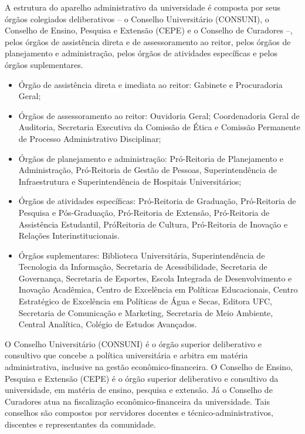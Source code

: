 A estrutura do aparelho administrativo da universidade é composta por seus órgãos colegiados deliberativos – o Conselho Universitário (CONSUNI), o Conselho de Ensino, Pesquisa e Extensão (CEPE) e o Conselho de Curadores –, pelos órgãos de assistência direta e de assessoramento ao reitor, pelos órgãos de planejamento e administração, pelos órgãos de atividades específicas e pelos órgãos suplementares.  
\begin{itemize}
    \item  Órgão de assistência direta e imediata ao reitor: Gabinete e Procuradoria Geral;
 \item  Órgãos de assessoramento ao reitor: Ouvidoria Geral; Coordenadoria Geral de Auditoria, Secretaria Executiva da Comissão de Ética e Comissão Permanente de Processo Administrativo Disciplinar;
 \item  Órgãos de planejamento e administração: Pró-Reitoria de Planejamento e Administração, Pró-Reitoria de Gestão de Pessoas, Superintendência de Infraestrutura e Superintendência de Hospitais Universitários;
 \item   Órgãos de atividades específicas: Pró-Reitoria de Graduação, Pró-Reitoria de Pesquisa e Pós-Graduação, Pró-Reitoria de Extensão, Pró-Reitoria de Assistência Estudantil, PróReitoria de Cultura, Pró-Reitoria de Inovação e Relações Interinstitucionais.
 \item  Órgãos suplementares: Biblioteca Universitária, Superintendência de Tecnologia da Informação, Secretaria de Acessibilidade, Secretaria de Governança, Secretaria de Esportes, Escola Integrada de Desenvolvimento e Inovação Acadêmica, Centro de Excelência em Políticas Educacionais, Centro Estratégico de Excelência em Políticas de Água e Secas, Editora UFC, Secretaria de Comunicação e Marketing, Secretaria de Meio Ambiente, Central Analítica, Colégio de Estudos Avançados.
\end{itemize}

O Conselho Universitário (CONSUNI) é o órgão superior deliberativo e consultivo que concebe a política universitária e arbitra em matéria administrativa, inclusive na gestão econômico-financeira. O Conselho de Ensino, Pesquisa e Extensão (CEPE) é o órgão superior deliberativo e consultivo da universidade, em matéria de ensino, pesquisa e extensão. Já o Conselho de Curadores atua na fiscalização econômico-financeira da universidade. Tais conselhos são compostos por servidores docentes e técnico-administrativos, discentes e representantes da comunidade.

